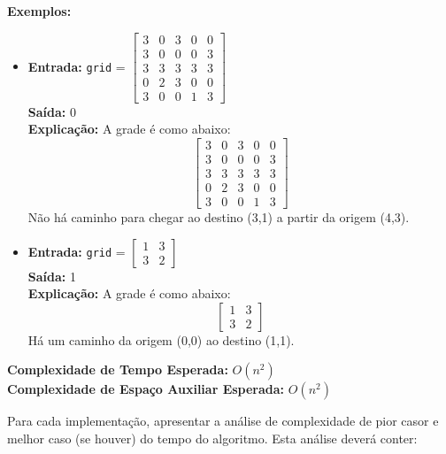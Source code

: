 \documentclass{article}
\begin{document}
\begin{enumerate}
    \textbf{Exemplos:}
    \begin{itemize}
        \item \textbf{Entrada:} \texttt{grid} = \(\begin{bmatrix}3 & 0 & 3 & 0 & 0\\3 & 0 & 0 & 0 & 3\\3 & 3 & 3 & 3 & 3\\0 & 2 & 3 & 0 & 0\\3 & 0 & 0 & 1 & 3\end{bmatrix}\) \\
        \textbf{Saída:} 0 \\
        \textbf{Explicação:} A grade é como abaixo: \\
        \[
        \begin{bmatrix}
        3 & 0 & 3 & 0 & 0 \\
        3 & 0 & 0 & 0 & 3 \\
        3 & 3 & 3 & 3 & 3 \\
        0 & 2 & 3 & 0 & 0 \\
        3 & 0 & 0 & 1 & 3
        \end{bmatrix}
        \]
        Não há caminho para chegar ao destino (3,1) a partir da origem (4,3).
        
        \item \textbf{Entrada:} \texttt{grid} = \(\begin{bmatrix}1 & 3\\3 & 2\end{bmatrix}\) \\
        \textbf{Saída:} 1 \\
        \textbf{Explicação:} A grade é como abaixo: \\
        \[
        \begin{bmatrix}
        1 & 3 \\
        3 & 2
        \end{bmatrix}
        \]
        Há um caminho da origem (0,0) ao destino (1,1).
    \end{itemize}
    
    \textbf{Complexidade de Tempo Esperada:} \( O(n^2) \) \\
    \textbf{Complexidade de Espaço Auxiliar Esperada:} \( O(n^2) \)
    
\end{enumerate}

Para cada implementação, apresentar a análise de complexidade de pior casor e melhor caso (se houver) do tempo do algoritmo. Esta análise deverá conter:
\end{document}
